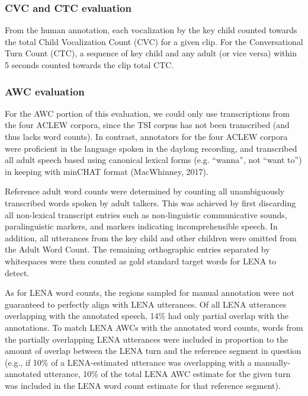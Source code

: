 \documentclass[english,floatsintext,man]{apa6}
\begin{document}
\subsubsection{CVC and CTC evaluation}\label{cvc-and-ctc-evaluation}

From the human annotation, each vocalization by the key child counted
towards the total Child Vocalization Count (CVC) for a given clip. For
the Conversational Turn Count (CTC), a sequence of key child and any
adult (or vice versa) within 5 seconds counted towards the clip total
CTC.

\subsubsection{AWC evaluation}\label{awc-evaluation}

For the AWC portion of this evaluation, we could only use transcriptions
from the four ACLEW corpora, since the TSI corpus has not been
transcribed (and thus lacks word counts). In contrast, annotators for
the four ACLEW corpora were proficient in the language spoken in the
daylong recording, and transcribed all adult speech based using
canonical lexical forms (e.g. \enquote{wanna}, not \enquote{want to}) in
keeping with minCHAT format (MacWhinney, 2017).

Reference adult word counts were determined by counting all
unambiguously transcribed words spoken by adult talkers. This was
achieved by first discarding all non-lexical transcript entries such as
non-linguistic communicative sounds, paralinguistic markers, and markers
indicating incomprehensible speech. In addition, all utterances from the
key child and other children were omitted from the Adult Word Count. The
remaining orthographic entries separated by whitespaces were then
counted as gold standard target words for LENA to detect.

As for LENA word counts, the regions sampled for manual annotation were
not guaranteed to perfectly align with LENA utterances. Of all LENA
utterances overlapping with the annotated speech, 14\% had only partial
overlap with the annotations. To match LENA AWCs with the annotated word
counts, words from the partially overlapping LENA utterances were
included in proportion to the amount of overlap between the LENA turn
and the reference segment in question (e.g., if 10\% of a LENA-estimated
utterance was overlapping with a manually-annotated utterance, 10\% of
the total LENA AWC estimate for the given turn was included in the LENA
word count estimate for that reference segment).
\end{document}
